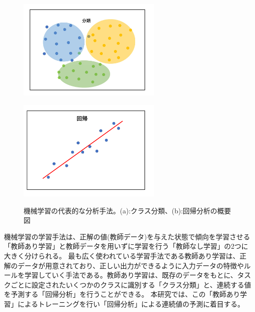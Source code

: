\begin{figure}[tb]
  \centering
    \begin{minipage}[b]{0.4\linewidth}
        \centering
        \includegraphics[clip, width=7cm]{fig/4/classification.pdf}
        \hspace{-1cm}
        \subcaption{}
        \label{fig:regre}
    \end{minipage}
    \hfill
    \begin{minipage}[b]{0.4\linewidth}
        \centering
        \includegraphics[clip, width=7cm]{fig/4/regression.pdf}
        \hspace{-1cm}
        \subcaption{}
        \label{fig:class}
    \end{minipage}
  \caption{機械学習の代表的な分析手法。(a):クラス分類、(b):回帰分析の概要図}
  \label{fig:fit_def}
\end{figure}

機械学習の学習手法は、正解の値(教師データ)を与えた状態で傾向を学習させる「教師あり学習」と教師データを用いずに学習を行う「教師なし学習」の2つに大きく分けられる。
最も広く使われている学習手法である教師あり学習は、正解のデータが用意されており、正しい出力ができるように入力データの特徴やルールを学習していく手法である。教師あり学習は、既存のデータをもとに、タスクごとに設定されたいくつかのクラスに識別する「クラス分類」と、連続する値を予測する「回帰分析」を行うことができる。
本研究では、この「教師あり学習」によるトレーニングを行い「回帰分析」による連続値の予測に着目する。

